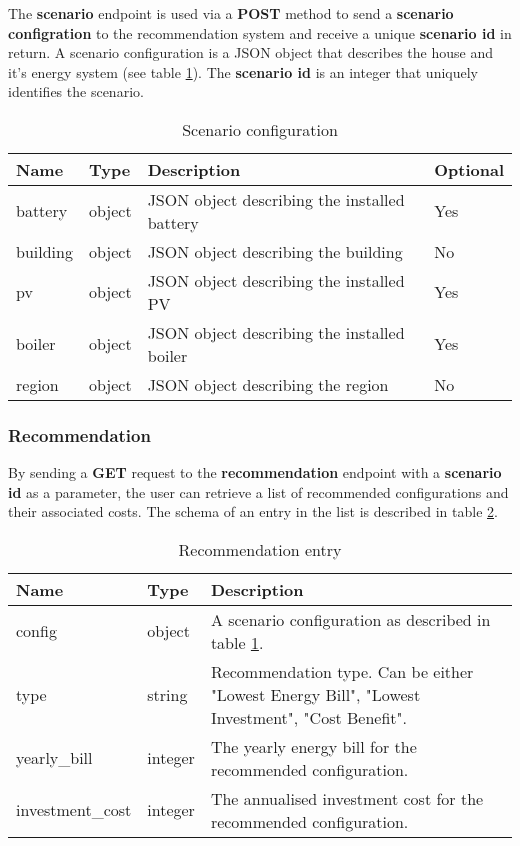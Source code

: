 The \textbf{scenario} endpoint is used via a \textbf{POST} method to send a \textbf{scenario configration} to the recommendation system
and receive a unique \textbf{scenario id} in return. A scenario configuration is a JSON object that describes the house and it's energy system
(see table \ref{tab:properties_config}). The \textbf{scenario id} is an integer that uniquely identifies the scenario.
\begin{table}[h!]
    \centering
    \small
    \begin{tabular}{ | p{} | p{} | p{} | p{} | } 
    \hline
    Name & Type & Description & Optional \\
    \hline
    battery & object & JSON object describing the installed battery & Yes \\
    \hline
    building & object & JSON object describing the building & No \\
    \hline
    pv & object & JSON object describing the installed PV & Yes \\
    \hline
    boiler & object & JSON object describing the installed boiler & Yes \\
    \hline 
    region & object & JSON object describing the region & No \\
    \hline
    \end{tabular}
    \caption{Scenario configuration}
    \label{tab:properties_config}
\end{table}


\subsubsection{Recommendation}

By sending a \textbf{GET} request to the \textbf{recommendation} endpoint with a \textbf{scenario id} as a parameter,
the user can retrieve a list of recommended configurations and their associated costs.
The schema of an entry in the list is described in table \ref{tab:properties_recommendation_endpoint}.

\begin{table}[h!]
    \centering
    \small
    \begin{tabular}{ | p{} | p{} | p{} | } 
    \hline
    Name & Type & Description \\
    \hline
    config & object & A scenario configuration as described in table \ref{tab:properties_config}. \\
    \hline
    type & string & Recommendation type. Can be either "Lowest Energy Bill", "Lowest Investment", "Cost Benefit". \\
    \hline
    yearly\_bill & integer & The yearly energy bill for the recommended configuration. \\
    \hline
    investment\_cost & integer & The annualised investment cost for the recommended configuration. \\
    \hline
    \end{tabular}
    \caption{Recommendation entry}
    \label{tab:properties_recommendation_endpoint}
\end{table}


